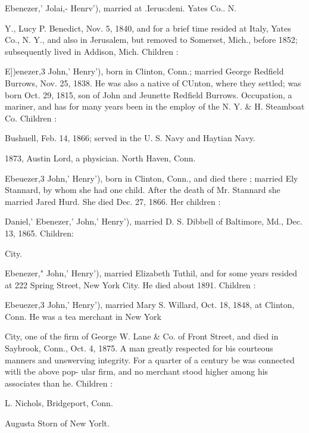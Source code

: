 \documentclass{book}
\begin{document}
Ebenezer,' Jolai,- Henrv'), married at .Ierus:deni. Yates Co.. N. 




Y., Lucy P. Benedict, Nov. 5, 1840, and for a brief time resided 
at Italy, Yates Co., N. Y., and also in Jerusalem, but removed 
to Somerset, Mich., before 1852; subsequently lived in Addison, 
Mich. Children : 





E])enezer,3 John,' Henry'), born in Clinton, Conn.; married 
George Redfield Burrows, Nov. 25, 1838. He was also a native 
of CUnton, where they settled; was born Oct. 29, 1815, son of 
John and Jeunette Redfield Burrows. Occupation, a mariner, 
and has for many years been in the employ of the N. Y. \& H. 
Steamboat Co. Children : 


Bushuell, Feb. 14, 1866; served in the U. S. Navy and Haytian 
Navy. 



1873, Austin Lord, a physician. North Haven, Conn. 


Ebeuezer,3 John,' Henry'), born in Clinton, Conn., and died 
there ; married Ely Stannard, by whom she had one child. After 
the death of Mr. Stannard she married Jared Hurd. She died 
Dec. 27, 1866. Her children : 




Daniel,' Ebenezer,' John,' Henry'), married D. S. Dibbell of 
Baltimore, Md., Dec. 13, 1865. Children: 


City. 


Ebenezer," John,' Henry'), married Elizabeth Tuthil, and for 
some years resided at 222 Spring Street, New York City. He 
died about 1891. Children : 




Ebeuezer,3 John,' Henry'), married Mary S. Willard, Oct. 18, 
1848, at Clinton, Conn. He was a tea merchant in New York 




City, one of the firm of George W. Lane \& Co. of Front Street, 
and died in Saybrook, Conn., Oct. 4, 1875. A man greatly 
respected for bis courteous manners and unswerving integrity. 
For a quarter of a century be was connected witli tbe above pop- 
ular firm, and no merchant stood higher among his associates 
than he. Children : 




L. Nichols, Bridgeport, Conn. 

Augusta Storn of New Yorlt. 
\end{document}
